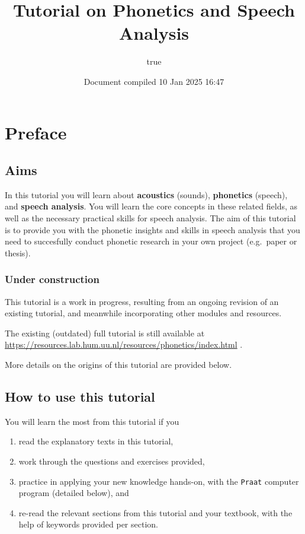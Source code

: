 \documentclass[
]{book}
\title{Tutorial on Phonetics and Speech Analysis}
\author{true}
\date{Document compiled 10 Jan 2025 16:47}
\providecommand{\tightlist}{%
  \setlength{\itemsep}{0pt}\setlength{\parskip}{0pt}}
\begin{document}
\maketitle

{
\setcounter{tocdepth}{1}
\tableofcontents
}
\chapter*{Preface}\label{preface}

\section*{Aims}\label{aims}

In this tutorial you will learn about \textbf{acoustics} (sounds), \textbf{phonetics} (speech), and \textbf{speech analysis}.
You will learn the core concepts in these related fields, as well as the necessary practical skills for speech analysis.
The aim of this tutorial is to provide you with the phonetic insights and skills in speech analysis that you need to succesfully conduct phonetic research in your own project (e.g.~paper or thesis).

\subsection*{Under construction}\label{under-construction}

This tutorial is a work in progress, resulting from an ongoing revision of an existing tutorial, and meanwhile incorporating other modules and resources.

The existing (outdated) full tutorial is still available at \url{https://resources.lab.hum.uu.nl/resources/phonetics/index.html}
.

More details on the origins of this tutorial are provided below.

\section*{How to use this tutorial}\label{how-to-use-this-tutorial}

You will learn the most from this tutorial if you

\begin{enumerate}
\def\labelenumi{(\arabic{enumi})}
\tightlist
\item
  read the explanatory texts in this tutorial,
\item
  work through the questions and exercises provided,
\item
  practice in applying your new knowledge hands-on, with the \texttt{Praat} computer program (detailed below), and
\item
  re-read the relevant sections from this tutorial and your textbook, with the help of keywords provided per section.
\end{enumerate}
\end{document}
